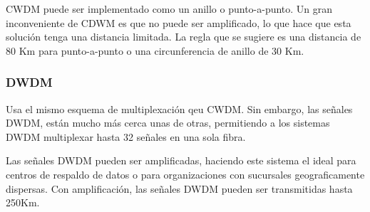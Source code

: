 \documentclass[10pt,journal,compsoc]{IEEEtran}
\begin{document}
CWDM puede ser implementado como un anillo o punto-a-punto. Un gran inconveniente de CDWM es que no puede ser amplificado, lo que hace que esta solución tenga una distancia limitada. La regla que se sugiere es una distancia de 80 Km para punto-a-punto o una circunferencia de anillo de 30 Km.

\subsubsection{DWDM}
Usa el mismo esquema de multiplexación qeu CWDM. Sin embargo, las señales DWDM, están mucho más cerca unas de otras, permitiendo a los sistemas DWDM multiplexar hasta 32 señales en una sola fibra. 

Las señales DWDM pueden ser amplificadas, haciendo este sistema el ideal para centros de respaldo de datos o para organizaciones con sucursales geograficamente dispersas. Con amplificación, las señales DWDM pueden ser transmitidas hasta 250Km.



%
%

\end{document}
